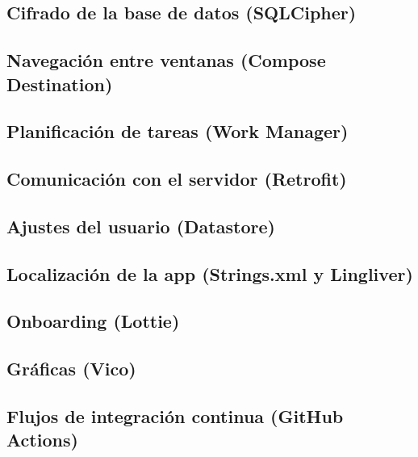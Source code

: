         \subsection{Cifrado de la base de datos (SQLCipher)}
        \subsection{Navegación entre ventanas (Compose Destination)}
        \subsection{Planificación de tareas (Work Manager)}
        \subsection{Comunicación con el servidor (Retrofit)}
        \subsection{Ajustes del usuario (Datastore)}
        \subsection{Localización de la app (Strings.xml y Lingliver)}
        \subsection{Onboarding (Lottie)}
        \subsection{Gráficas (Vico)}
        \subsection{Flujos de integración continua (GitHub Actions)}
            
            
            